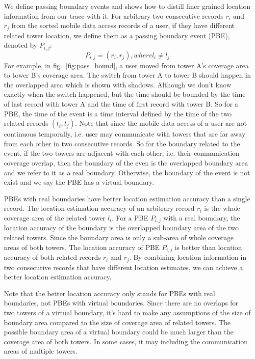 We define passing boundary events and shows how to distill finer grained location information from our trace with it. For arbitrary two consecutive records $r_i$ and $r_j$ from the sorted mobile data access records of a user, if they have different related tower location, we define them as a passing boundary event (PBE), denoted by $P_{i,j}$:
\[
P_{i,j} = (r_i, r_j),  where l_i \neq l_j
\]
For example, in fig.~\ref{fig:pass_bound}, a user moved from tower A's coverage area to tower B's coverage area. The switch from tower A to tower B should happen in the overlapped area which is shown with shadows. Although we don't know exactly when the switch happened, but the time should be bounded by the time of last record with tower A and the time of first record with tower B. So for a PBE, the time of the event is a time interval defined by the time of the two related records $(t_i, t_j)$. Note that since the mobile data access of a user are not continuous temporally, i.e. user may communicate with towers that are far away from each other in two consecutive records. So for the boundary related to the event, if the two towers are adjacent with each other, i.e. their communication coverage overlap, then the boundary of the even is the overlapped boundary area and we refer to it as a real boundary. Otherwise, the boundary of the event is not exist and we say the PBE has a virtual boundary. 

PBEs with real boundaries have better location estimation accuracy than a single record. The location estimation accuracy of an arbitrary record $r_i$ is the whole coverage area of the related tower $l_i$. For a PBE $P_{i,j}$ with a real boundary, the location accuracy of the boundary is the overlapped boundary area of the two related towers. Since the boundary area is only a sub-area of whole coverage areas of both towers. The location accuracy of PBE $P_{i,j}$ is better than location accuracy of both related records $r_i$ and $r_j$. By combining location information in two consecutive records that have different location estimates, we can achieve a better location estimation accuracy.

Note that the better location accuracy only stands for PBEs with real boundaries, not PBEs with virtual boundaries. Since there are no overlaps for two towers of a virtual boundary, it's hard to make any assumptions of the size of boundary area compared to the size of coverage area of related towers. The possible boundary area of a virtual boundary could be much larger than the coverage area of both towers. In some cases, it may including the communication areas of multiple towers. 

